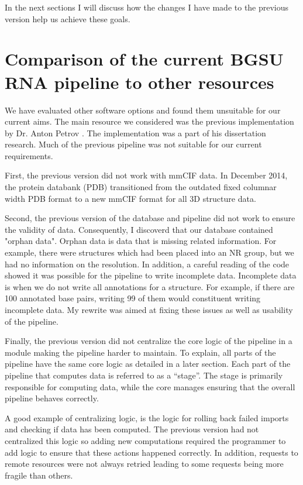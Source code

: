 In the next sections I will discuss how the changes I have made to the previous
version help us achieve these goals.

\section{Comparison of the current BGSU RNA pipeline to other resources}

We have evaluated other software options and found them unsuitable for our
current aims. The main resource we considered was the previous implementation by
Dr. Anton Petrov \cite{Petrov2012}. The implementation was a part of his dissertation research.
Much of the previous pipeline was not suitable for our current requirements.

First, the previous version did not work with mmCIF data. In December 2014, the
protein databank (PDB) transitioned from the outdated fixed columnar width  PDB
format to a new mmCIF format for all 3D structure data.

Second, the previous version of the database and pipeline did not work to ensure
the validity of data. Consequently, I discoverd that our database contained
"orphan data". Orphan data is data that is missing related information. For
example, there were structures which had been placed into an NR group, but we
had no information on the resolution. In addition, a careful reading of the code
showed it was possible for the pipeline to write incomplete data. Incomplete
data is when we do not write all annotations for a structure. For example, if
there are 100 annotated base pairs, writing 99 of them would constituent writing
incomplete data. My rewrite was aimed at fixing these issues as well as
usability of the pipeline.

Finally, the previous version did not centralize the core logic of the pipeline
in a module making the pipeline harder to maintain. To explain, all parts of the
pipeline have the same core logic as detailed in a later section. Each part of
the pipeline that computes data is referred to as a ``stage''. The stage is
primarily responsible for computing data, while the core manages ensuring that
the overall pipeline behaves correctly.

A good example of centralizing logic, is the logic for rolling back failed
imports and checking if data has been computed. The previous version had not
centralized this logic so adding new computations required the programmer to add
logic to ensure that these actions happened correctly. In addition, requests to
remote resources were not always retried leading to some requests being more
fragile than others.

